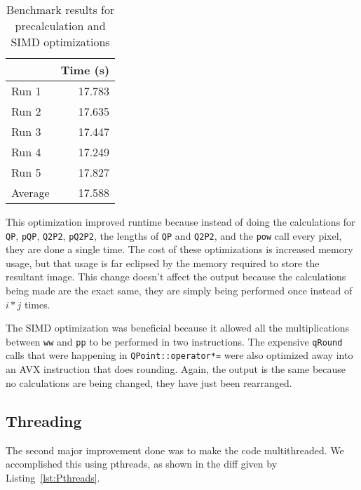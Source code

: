 \documentclass[12pt]{article}
\begin{document}

\begin{table}[H]
  \centering
  \begin{tabular}{lr}
    & {\bf Time (s)} \\
    \hline
    Run 1 & 17.783 \\
    Run 2 & 17.635 \\
    Run 3 & 17.447 \\
    Run 4 & 17.249 \\
    Run 5 & 17.827 \\
    \hline
    Average & 17.588 \\
  \end{tabular}
  \caption{Benchmark results for precalculation and SIMD optimizations}
  \label{tbl-precalculation}
\end{table}

This optimization improved runtime because instead of doing the
calculations for \texttt{QP}, \texttt{pQP}, \texttt{Q2P2},
\texttt{pQ2P2}, the lengths of \texttt{QP} and \texttt{Q2P2}, and the
\texttt{pow} call every pixel, they are done a single time. The cost
of these optimizations is increased memory usage, but that usage is
far eclipsed by the memory required to store the resultant image. This
change doesn't affect the output because the calculations being made
are the exact same, they are simply being performed once instead
of $i*j$ times.

The SIMD optimization was beneficial because it allowed all the
multiplications between \texttt{ww} and \texttt{pp} to be performed in
two instructions. The expensive \texttt{qRound} calls that were
happening in \texttt{QPoint::operator*=} were also optimized away into
an AVX instruction that does rounding. Again, the output is the same
because no calculations are being changed, they have just been
rearranged.

\subsection*{Threading}

The second major improvement done was to make the code multithreaded. We accomplished this using pthreads, as shown in the diff given by Listing~\ref{lst:Pthreads}.
\end{document}

